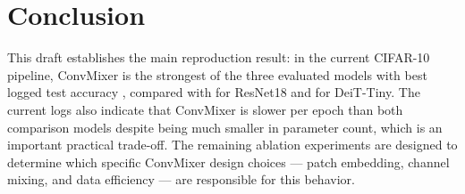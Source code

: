 \section{Conclusion}

This draft establishes the main reproduction result: in the current CIFAR-10 pipeline, ConvMixer is the strongest of the three evaluated models with best logged test accuracy \convmixeracc, compared with \resnetacc{} for ResNet18 and \deitacc{} for DeiT-Tiny. The current logs also indicate that ConvMixer is slower per epoch than both comparison models despite being much smaller in parameter count, which is an important practical trade-off. The remaining ablation experiments are designed to determine which specific ConvMixer design choices --- patch embedding, channel mixing, and data efficiency --- are responsible for this behavior.
